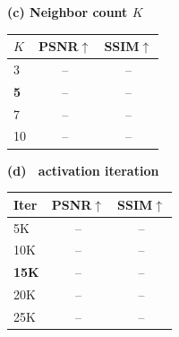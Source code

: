 \begin{table}[t]
\begin{minipage}[t]{0.48\linewidth}
\centering
\vspace{0pt}
\scriptsize
\textbf{(c) Neighbor count $K$}\\[3pt]
\begin{tabular}{@{}lcc@{}}
\toprule
$K$ & PSNR$\uparrow$ & SSIM$\uparrow$ \\
\midrule
3 & -- & -- \\
\textbf{5} & -- & -- \\
7 & -- & -- \\
10 & -- & -- \\
\bottomrule
\end{tabular}
\end{minipage}%
\hfill%
\begin{minipage}[t]{0.48\linewidth}
\centering
\vspace{0pt}
\scriptsize
\textbf{(d) \adm\ activation iteration}\\[3pt]
\begin{tabular}{@{}lcc@{}}
\toprule
Iter & PSNR$\uparrow$ & SSIM$\uparrow$ \\
\midrule
5K & -- & -- \\
10K & -- & -- \\
\textbf{15K} & -- & -- \\
20K & -- & -- \\
25K & -- & -- \\
\bottomrule
\end{tabular}
\end{minipage}
\end{table}
